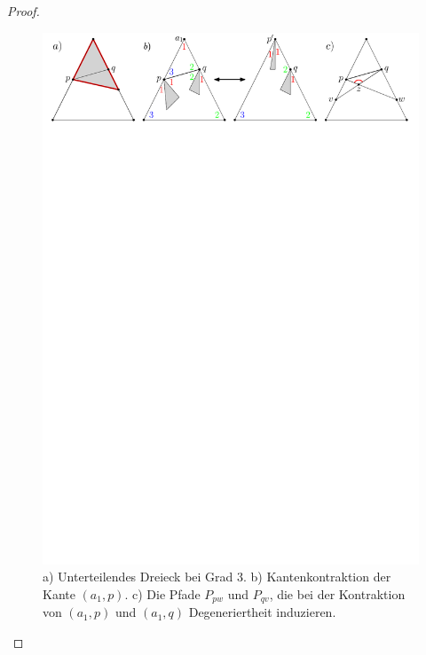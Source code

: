 \begin{proof}
\begin{figure}[b!]
	\centering
	  \includegraphics[width=1\textwidth]{lem3_1.pdf}
    	\caption{a) Unterteilendes Dreieck bei Grad 3. b) Kantenkontraktion der Kante $(a_1,p)$. c) Die Pfade $P_{pw}$ und $P_{qv}$, die bei der Kontraktion von $(a_1,p)$ und $(a_1,q)$ Degeneriertheit induzieren.}
    	\label{pic_lem3_1}
\end{figure}


\end{proof}
